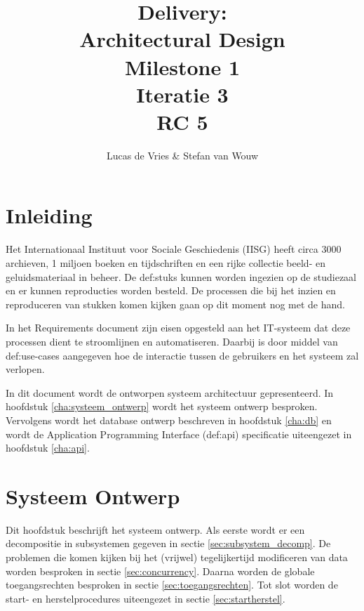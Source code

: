 \documentclass[a4paper,titlepage]{report}
\title{Delivery:\\ Architectural Design\\ Milestone 1\\ Iteratie 3\\ RC 5}
\author{Lucas de Vries \& Stefan van Wouw}
\begin{document}
\maketitle


\setcounter{secnumdepth}{5}
\setcounter{tocdepth}{2}

\tableofcontents
\pagebreak

\chapter{Inleiding}
Het Internationaal Instituut voor Sociale Geschiedenis (IISG) heeft circa 3000
archieven, 1 miljoen boeken en tijdschriften en een rijke collectie beeld- en
geluidsmateriaal in beheer. De \glspl{def:stuk} kunnen worden ingezien op de
studiezaal en er kunnen reproducties worden besteld. De processen die bij het
inzien en reproduceren van stukken komen kijken gaan op dit moment nog met de
hand. 

In het Requirements document zijn eisen opgesteld aan het IT-systeem dat deze
processen dient te stroomlijnen en automatiseren. Daarbij is door middel van
\glspl{def:use-case} aangegeven hoe de interactie tussen de gebruikers en het
systeem zal verlopen.

In dit document wordt de ontworpen systeem architectuur gepresenteerd. In
hoofdstuk \ref{cha:systeem_ontwerp} wordt het systeem ontwerp besproken.
Vervolgens wordt het database ontwerp beschreven in hoofdstuk \ref{cha:db} en
wordt de Application Programming Interface (\gls{def:api}) specificatie uiteengezet in
hoofdstuk \ref{cha:api}.

\chapter{Systeem Ontwerp}
Dit hoofdstuk beschrijft het systeem ontwerp. Als eerste wordt er een
decompositie in subsystemen gegeven in sectie \ref{sec:subsystem_decomp}. De
problemen die komen kijken bij het (vrijwel)
tegelijkertijd modificeren van data worden besproken in sectie
\ref{sec:concurrency}. Daarna worden de globale toegangsrechten besproken in
sectie \ref{sec:toegangsrechten}. Tot slot worden de start- en
herstelprocedures uiteengezet in sectie \ref{sec:startherstel}.


\label{cha:systeem_ontwerp}
\end{document}

